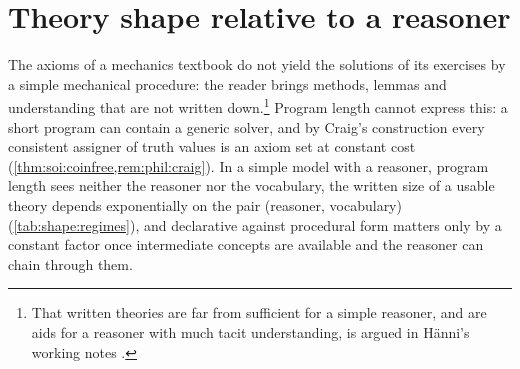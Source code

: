 \section{Theory shape relative to a reasoner}\label{sec:shape}

The axioms of a mechanics textbook do not yield the solutions of its exercises by a simple mechanical procedure: the reader brings methods, lemmas and understanding that are not written down.\footnote{That written theories are far from sufficient for a simple reasoner, and are aids for a reasoner with much tacit understanding, is argued in H\"anni's working notes \citep{hanni2026notes}.} Program length cannot express this: a short program can contain a generic solver, and by Craig's construction every consistent assigner of truth values is an axiom set at constant cost (\cref{thm:soi:coinfree,rem:phil:craig}). In a simple model with a reasoner, program length sees neither the reasoner nor the vocabulary, the written size of a usable theory depends exponentially on the pair (reasoner, vocabulary) (\cref{tab:shape:regimes}), and declarative against procedural form matters only by a constant factor once intermediate concepts are available and the reasoner can chain through them.

